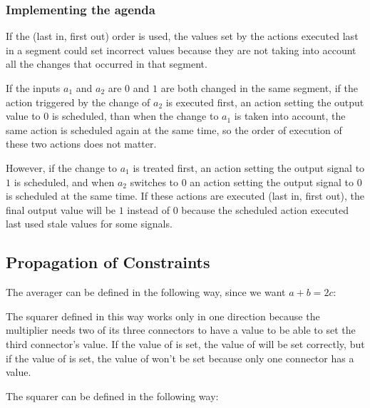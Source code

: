 \subsubsection{Implementing the agenda}

\begin{exe}[3.32]
    If the (last in, first out) order is used, the values set by the actions 
    executed last in a segment could set incorrect values because they are not 
    taking into account all the changes that occurred in that segment.

    If the inputs $a_1$ and $a_2$ are $0$ and $1$ are both changed in the same 
    segment, if the action triggered by the change of $a_2$ is executed first, 
    an action setting the output value to $0$ is scheduled, than when the change 
    to $a_1$ is taken into account, the same action is scheduled again at the 
    same time, so the order of execution of these two actions does not matter.

    However, if the change to $a_1$ is treated first, an action setting the 
    output signal to $1$ is scheduled, and when $a_2$ switches to $0$ an action 
    setting the output signal to $0$ is scheduled at the same time. If these 
    actions are executed (last in, first out), the final output value will be 
    $1$ instead of $0$ because the scheduled action executed last used stale 
    values for some signals.
\end{exe}

\subsection{Propagation of Constraints}

\begin{exe}[3.33]
    The averager can be defined in the following way, since we want 
    $ a + b = 2c$:
\end{exe}

\begin{exe}[3.34]
    The squarer defined in this way works only in one direction because the 
    multiplier needs two of its three connectors to have a value to be able to 
    set the third connector’s value. If the value of  is set, the value 
    of  will be set correctly, but if the value of  is set, the 
    value of  won’t be set because only one connector has a value.
\end{exe}

\begin{exe}[3.35]
    The squarer can be defined in the following way:
\end{exe}

